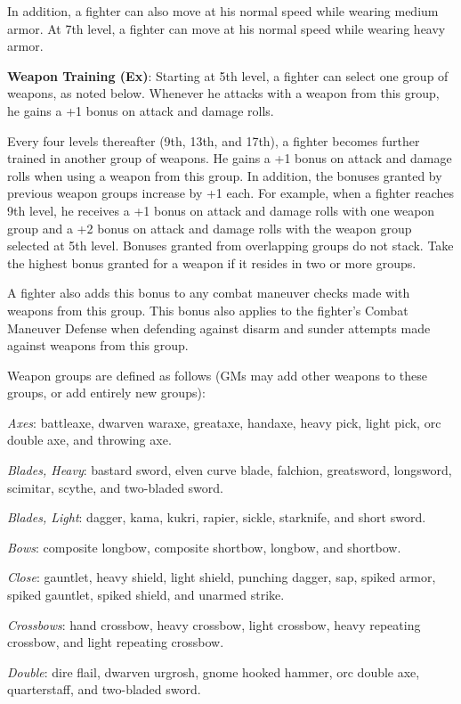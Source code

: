 In addition, a fighter can also move at his normal speed while wearing medium armor. At 7th level, a
fighter can move at his normal speed while wearing heavy armor.

\textbf{Weapon Training (Ex)}: Starting at 5th level, a fighter can select one group of weapons, as noted below.
Whenever he attacks with a weapon from this group, he gains a +1 bonus on attack and damage rolls.

Every four levels thereafter (9th, 13th, and 17th), a fighter becomes further trained in another group of weapons.
He gains a +1 bonus on attack and damage rolls when using a weapon from this group. In addition, the bonuses 
granted by previous weapon groups increase by +1 each. For example, when a fighter reaches 9th level, he
receives a +1 bonus on attack and damage rolls with one weapon group and a +2 bonus on attack and damage
rolls with the weapon group selected at 5th level. Bonuses granted from overlapping groups do not stack.
Take the highest bonus granted for a weapon if it resides in two or more groups.

A fighter also adds this bonus to any combat maneuver checks made with weapons from this group. This bonus also
applies to the fighter's Combat Maneuver Defense when defending against disarm and sunder attempts made against
weapons from this group.

Weapon groups are defined as follows (GMs may add other weapons to these groups, or add entirely new groups):

\textit{Axes}: battleaxe, dwarven waraxe, greataxe, handaxe, heavy pick, light pick, orc double axe, 
    and throwing axe. 

\textit{Blades, Heavy}: bastard sword, elven curve blade, falchion, greatsword, longsword, scimitar,
    scythe, and two-bladed sword.

\textit{Blades, Light}: dagger, kama, kukri, rapier, sickle, starknife, and short sword.

\textit{Bows}: composite longbow, composite shortbow, longbow, and shortbow.

\textit{Close}: gauntlet, heavy shield, light shield, punching dagger, sap, spiked armor, spiked gauntlet,
    spiked shield, and unarmed strike.

\textit{Crossbows}: hand crossbow, heavy crossbow, light crossbow, heavy repeating crossbow, and light 
    repeating crossbow.

\textit{Double}: dire flail, dwarven urgrosh, gnome hooked hammer, orc double axe, quarterstaff, and
    two-bladed sword.

